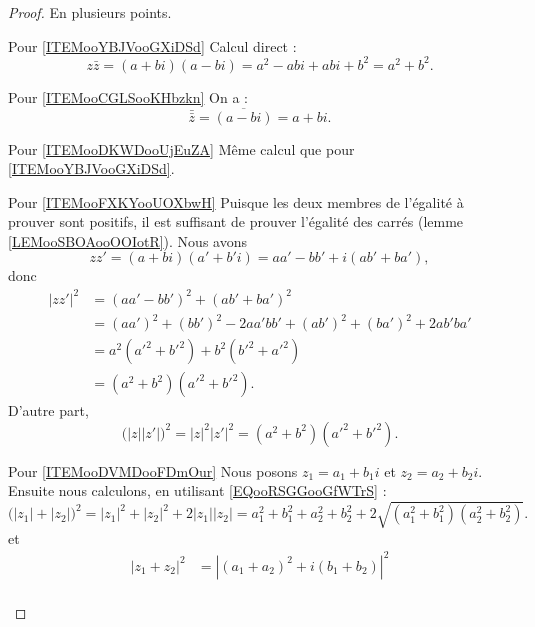 \begin{proof}
	En plusieurs points.
	\begin{subproof}
		\item[Pour \ref{ITEMooYBJVooGXiDSd}]
		Calcul direct :
		\begin{equation}
			z\bar z=(a+bi)(a-bi)=a^2-abi+abi+b^2=a^2+b^2.
		\end{equation}
		\item[Pour \ref{ITEMooCGLSooKHbzkn}]
		On a :
		\begin{equation}
			\bar{\bar z}=\overline{ (a-bi) }=a+bi.
		\end{equation}
		\item[Pour \ref{ITEMooDKWDooUjEuZA}]
		Même calcul que pour \ref{ITEMooYBJVooGXiDSd}.
		\item[Pour \ref{ITEMooFXKYooUOXbwH}]
		Puisque les deux membres de l'égalité à prouver sont positifs, il est suffisant de prouver l'égalité des carrés (lemme \ref{LEMooSBOAooOOIotR}). Nous avons
		\begin{equation}
			zz'=(a+bi)(a'+b'i)=aa'-bb'+i(ab'+ba'),
		\end{equation}
		donc
		\begin{subequations}
			\begin{align}
				| zz' |^2 & =(aa'-bb')^2+(ab'+ba')^2                         \\
				          & =(aa')^2+(bb')^2-2aa'bb'+(ab')^2+(ba')^2+2ab'ba' \\
				          & =a^2(a'^2+b'^2)+b^2(b'^2+a'^2)                   \\
				          & =(a^2+b^2)(a'^2+b'^2).
			\end{align}
		\end{subequations}
		D'autre part,
		\begin{equation}        \label{EQooRSGGooGfWTrS}
			\big( | z | |z' | \big)^2=| z |^2| z' |^2=(a^2+b^2)(a'^2+b'^2).
		\end{equation}
		\item[Pour \ref{ITEMooDVMDooFDmOur}]
		Nous posons \( z_1=a_1+b_1i\) et \( z_2=a_2+b_2i\). Ensuite nous calculons, en utilisant \eqref{EQooRSGGooGfWTrS} :
		\begin{equation}
			\big( | z_1 |+| z_2 | \big)^2=| z_1 |^2+| z_2 |^2+2| z_1 | |z_2 |=a_1^2+b_1^2+a_2^2+b_2^2+2\sqrt{ (a_1^2+b_1^2)(a_2^2+b_2^2) }.
		\end{equation}
		et
		\begin{subequations}
			\begin{align}
				| z_1+z_2 |^2 & =| (a_1+a_2)^2+i(b_1+b_2) |^2             \\

\end{align}
\end{subequations}
\end{subproof}
\end{proof}
